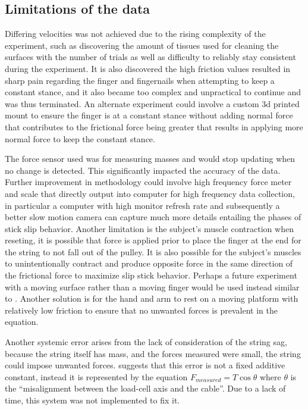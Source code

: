 \documentclass[12pt]{article}
\begin{document}
\subsection{Limitations of the data}
Differing velocities was not achieved due to the rising complexity of the experiment, such as discovering the amount of tissues used for cleaning the surfaces with the number of trials as well as difficulty to reliably stay consistent during the experiment. 
It is also discovered the high friction values resulted in sharp pain regarding the finger and fingernails when attempting to keep a constant stance, and it also became too complex and unpractical to continue and was thus terminated.
An alternate experiment could involve a custom 3d printed mount to ensure the finger is at a constant stance without adding normal force that contributes to the frictional force being greater that results in applying more normal force to keep the constant stance.

The force sensor used was for measuring masses and would stop updating when no change is detected. This significantly impacted the accuracy of the data. Further improvement in methodology could involve high frequency force meter and scale that directly output into computer for high frequency data collection, in particular a computer with high monitor refresh rate and subsequently a better slow motion camera can capture much more details entailing the phases of stick slip behavior.
Another limitation is the subject's muscle contraction when reseting, it is possible that force is applied prior to place the finger at the end for the string to not fall out of the pulley. It is also possible for the subject's muscles to unintentionally contract and produce opposite force in the same direction of the frictional force to maximize slip stick behavior. Perhaps a future experiment with a moving surface rather than a moving finger would be used instead similar to \cite{p:ssf}. Another solution is for the hand and arm to rest on a moving platform with relatively low friction to ensure that no unwanted forces is prevalent in the equation.

Another systemic error arises from the lack of consideration of the string sag, because the string itself has mass, and the forces measured were small, the string could impose unwanted forces. \parencite{huang2021cabledriven} suggests that this error is not a fixed additive constant, instead it is represented by the equation $F_{measured} = T \cos \theta$ where $\theta$ is the ``misalignment between the load-cell axis and the cable''. Due to a lack of time, this system was not implemented to fix it.
\end{document}
